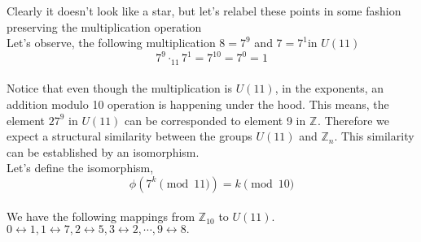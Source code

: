 \documentclass{article}
\begin{document}
\begin{center}
\end{center}
Clearly it doesn't look like a star, but let's relabel these points in some fashion preserving the multiplication operation\\[2mm]
Let's observe, the following multiplication $8 = 7^{9}$ and $7 = 7^1$in $U(11)$
$$7^{9} \cdot_{11} 7^ 1 = 7^{10} = 7^{0} = 1$$\\
Notice that even though the multiplication is $U(11)$, in the exponents, an addition modulo 10 operation is happening under the hood. This means, the element $27^9$ in $U(11)$ can be corresponded to element 9 in $\mathbb{Z}_{}$. Therefore we expect a structural similarity between the groups $U(11)$ and $\mathbb{Z}_n$. This similarity can be established by an isomorphism.\\[2mm]
Let's define the isomorphism,
$$\phi(7^k\pmod{11}) = k \pmod{10}$$\\
We have the following mappings from $\mathbb{Z}_{10}$ to $U(11)$. $0 \leftrightarrow 1, 1 \leftrightarrow 7, 2 \leftrightarrow 5, 3 \leftrightarrow 2, \cdots , 9 \leftrightarrow 8.$ 
 
\end{document}

